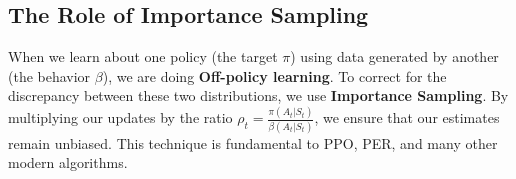 \subsection{The Role of Importance Sampling}
When we learn about one policy (the target $\pi$) using data generated by another (the behavior $\beta$), we are doing \textbf{Off-policy learning}. To correct for the discrepancy between these two distributions, we use \textbf{Importance Sampling}. By multiplying our updates by the ratio $\rho_t = \frac{\pi(A_t|S_t)}{\beta(A_t|S_t)}$, we ensure that our estimates remain unbiased. This technique is fundamental to PPO, PER, and many other modern algorithms.
